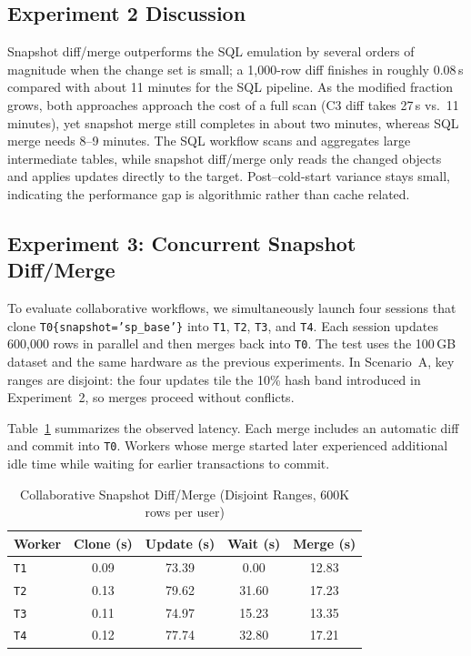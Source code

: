 \documentclass[sigconf,nonacm]{acmart} %
\begin{document}
\subsection{Experiment 2 Discussion}
Snapshot diff/merge outperforms the SQL emulation by several orders of
magnitude when the change set is small; a 1{,}000-row diff finishes in
roughly 0.08\,s compared with about 11 minutes for the SQL pipeline.  As
the modified fraction grows, both approaches approach the cost of a full
scan (C3 diff takes 27\,s vs.\ 11 minutes), yet snapshot merge still
completes in about two minutes, whereas SQL merge needs 8--9 minutes.
The SQL workflow scans and aggregates large intermediate tables, while
snapshot diff/merge only reads the changed objects and applies updates
directly to the target.  Post–cold-start variance stays small, indicating
the performance gap is algorithmic rather than cache related.
\subsection{Experiment 3: Concurrent Snapshot Diff/Merge}
To evaluate collaborative workflows, we simultaneously launch four
sessions that clone \texttt{T0\{snapshot='sp\_base'\}} into
\texttt{T1}, \texttt{T2}, \texttt{T3}, and \texttt{T4}.  Each session
updates 600{,}000 rows in parallel and then merges back into
\texttt{T0}.  The test uses the 100\,GB dataset and the same hardware as
the previous experiments.  In Scenario~A, key ranges are disjoint: the
four updates tile the 10\% hash band introduced in Experiment~2, so
merges proceed without conflicts.

Table~\ref{tab:collab-nonoverlap} summarizes the observed latency.  Each
merge includes an automatic diff and commit into \texttt{T0}.  Workers
whose merge started later experienced additional idle time while waiting
for earlier transactions to commit.

\begin{table}[h]
  \centering
  \caption{Collaborative Snapshot Diff/Merge (Disjoint Ranges, 600K rows per user)}
  \label{tab:collab-nonoverlap}
  \begin{tabular}{lcccc}
    \toprule
    Worker & Clone (s) & Update (s) & Wait (s) & Merge (s) \\
    \midrule
    \texttt{T1} & 0.09 & 73.39 & 0.00 & 12.83 \\
    \texttt{T2} & 0.13 & 79.62 & 31.60 & 17.23 \\
    \texttt{T3} & 0.11 & 74.97 & 15.23 & 13.35 \\
    \texttt{T4} & 0.12 & 77.74 & 32.80 & 17.21 \\
    \bottomrule
  \end{tabular}
\end{table}
\end{document}
